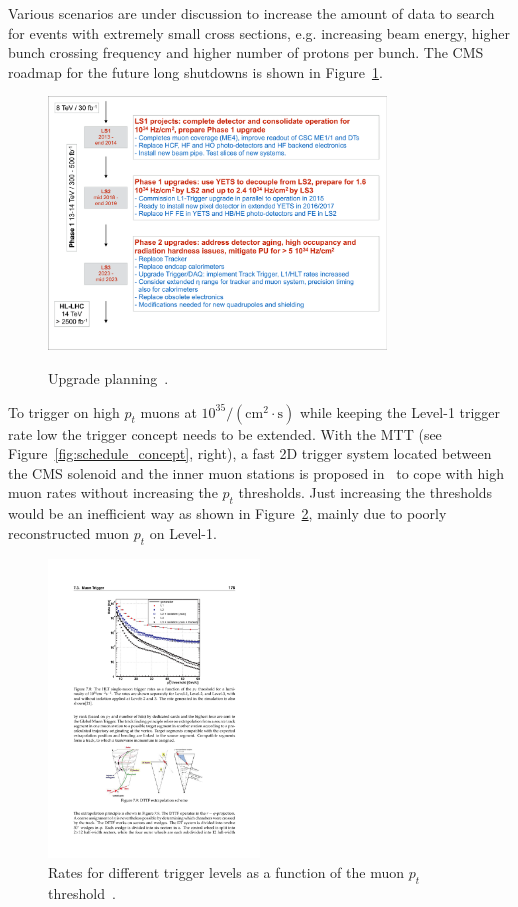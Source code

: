 Various scenarios are under discussion to increase the amount of data to search for events with extremely small cross sections, e.g. increasing beam energy, higher bunch 
crossing frequency and higher number of protons per bunch. The CMS roadmap for the future long shutdowns is shown in Figure~\ref{fig:upgrade_planning}.
\begin{figure}[htbp]
\centering
\includegraphics[width=0.8\textwidth]{Figures/pooth/upgrade_planning.pdf}\\
\caption{Upgrade planning~\cite{upgrade_planning}.} 
\label{fig:upgrade_planning}
\end{figure}

To trigger on high $p_t$ muons at $10^{35}/(\mathrm{cm}^2 \cdot\mathrm{s})$ while keeping the Level-1 trigger rate low the trigger concept needs to be extended. With the MTT (see 
Figure~\ref{fig:schedule_concept}, right), a fast 2D trigger system located between the CMS solenoid and the inner muon stations is proposed in~\cite{mtt_concept} to cope with high 
muon rates without increasing the $p_t$ thresholds. Just increasing the thresholds would be an inefficient way as shown in Figure~\ref{fig:pt_threshold}, mainly due to poorly 
reconstructed muon $p_t$ on Level-1. 
\begin{figure}[htbp]
\centering
\includegraphics[width=0.5\textwidth]{Figures/pooth/pt_threshold.pdf}
\caption{Rates for different trigger levels as a function of the muon $p_t$ threshold~\cite{pt_threshold}.}
\label{fig:pt_threshold}
\end{figure}

